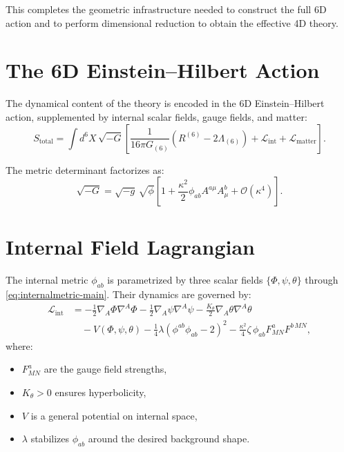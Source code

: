 \documentclass[12pt]{article}
\begin{document}
This completes the geometric infrastructure needed to construct the full
6D action and to perform dimensional reduction to obtain the effective 4D
theory.



\newpage
\section{The 6D Einstein--Hilbert Action}

The dynamical content of the theory is encoded in the 6D Einstein--Hilbert action,
supplemented by internal scalar fields, gauge fields, and matter:
\begin{equation}
S_{\text{total}}
=
\int d^6X\, \sqrt{-G}
\left[
\frac{1}{16\pi G_{(6)}} \left(R^{(6)} - 2\Lambda_{(6)}\right)
+ \mathcal{L}_{\text{int}}
+ \mathcal{L}_{\text{matter}}
\right].
\label{eq:6Daction-start}
\end{equation}

The metric determinant factorizes as:
\begin{equation}
\sqrt{-G}
=
\sqrt{-g}\,\sqrt{\phi}
\left[
1 + \frac{\kappa^2}{2}\phi_{ab}A^{a\mu}A^b_{\mu}
+ \mathcal{O}(\kappa^4)
\right].
\label{eq:sqrtG}
\end{equation}


\newpage
\section{Internal Field Lagrangian}

The internal metric \(\phi_{ab}\) is parametrized by three scalar fields
\(\{\Phi,\psi,\theta\}\) through \eqref{eq:internalmetric-main}. Their dynamics
are governed by:
\begin{align}
\mathcal{L}_{\text{int}}
&=
-\frac{1}{2} \nabla_A \Phi \nabla^A \Phi
-\frac{1}{2} \nabla_A \psi \nabla^A \psi
-\frac{K_\theta}{2} \nabla_A \theta \nabla^A \theta
\nonumber\\
&\quad
- V(\Phi,\psi,\theta)
- \frac{1}{4}\lambda\left( \phi^{ab}\phi_{ab} - 2 \right)^2
- \frac{\kappa^2}{4}\zeta \,\phi_{ab} F^{a}_{MN}F^{b\,MN},
\label{eq:Lint}
\end{align}
where:
\begin{itemize}
\item \(F^a_{MN}\) are the gauge field strengths,
\item \(K_\theta>0\) ensures hyperbolicity,
\item \(V\) is a general potential on internal space,
\item \(\lambda\) stabilizes \(\phi_{ab}\) around the desired background shape.
\end{itemize}
\end{document}
